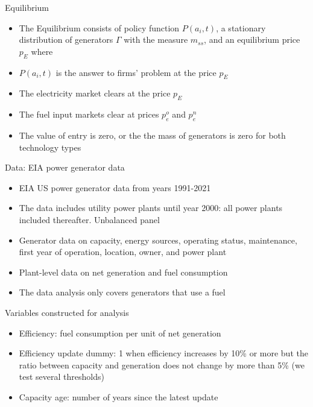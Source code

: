 \documentclass{beamer}
\begin{document}
\begin{frame}{Equilibrium}
    \begin{itemize}
        \item The Equilibrium consists of policy function $P(a_i,t)$, a stationary distribution of generators $\Gamma$ with the measure $m_{ss}$, and an equilibrium price $p_E$ where
        \item  $P(a_i,t)$ is the answer to firms' problem at the price $p_E$
        \item The electricity market clears at the price $p_E$ 
        \item The fuel input markets clear at prices $p_e^o$ and $p_e^n$
        \item The value of entry is zero, or the the mass of generators is zero for both technology types
    \end{itemize}
\end{frame}

\begin{frame}{Data: EIA power generator data}

\begin{itemize}
 \item EIA US power generator data from years 1991-2021
 \item The data includes utility power plants until year 2000: all power plants included thereafter. Unbalanced panel
 \item Generator data on capacity, energy sources, operating status, maintenance, first year of operation, location, owner, and power plant
 \item Plant-level data on net generation and fuel consumption
  \item The data analysis only covers generators that use a  fuel


\end{itemize}
    
\end{frame}
\begin{frame}{Variables constructed for analysis}

 \begin{itemize}
     \item Efficiency: fuel consumption per unit of net generation
     \item Efficiency update dummy: 1 when efficiency increases by 10\% or more but the ratio between capacity and generation does not change by more than 5\% (we test several thresholds)
     \item Capacity age: number of years since the latest update
 \end{itemize}

    
\end{frame}
\end{document}

